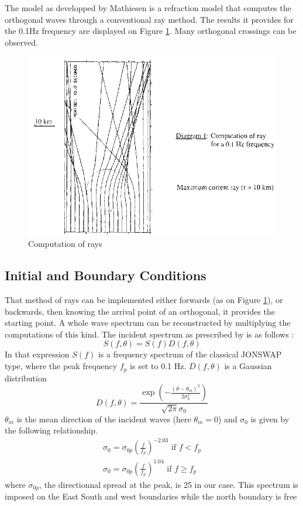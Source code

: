 The model as developped by Mathiesen is a refraction model that computes the
orthogonal waves through a conventional ray method. The results it provides for
the 0.1Hz frequency are displayed on Figure \ref{ray}. Many orthogonal
crossings can be observed.
\begin{figure} [!h]
\centering
\includegraphics[scale = 0.5]{diagram.png}
 \caption{Computation of rays}
\label{ray}
\end{figure}

\subsection{Initial and Boundary Conditions}

That method of rays can be implemented  either forwards (as on Figure
\ref{ray}), or backwards, then knowing the arrival point of an orthogonal,  it
provides the starting point. A whole wave spectrum can be reconstructed by
multiplying the computations of this kind. The incident spectrum as prescribed
by \cite{Mathiesen1987} is as follows :
$$
S(f,\theta)=S(f)D(f,\theta)
$$
In that expression $S(f)$ is a frequency spectrum of the classical JONSWAP
type, where the peak frequency $f_p$ is set to 0.1 Hz.
$D(f,\theta)$ is a Gaussian distribution
$$
D(f,\theta)=\frac{\exp(-\frac{(\theta-\theta_m)^2}{2\sigma_0^2} )}{\sqrt{2\pi}\sigma_0}
$$
$\theta_m$ is the mean direction of the incident waves (here $\theta_m=0$) and
$\sigma_0$ is given by the following relationship.
$$
\left.
\begin{array}{ll}
\sigma_0= \sigma_{0p}(\frac{f}{f_p})^{-2.03}\mbox{ if }f<f_p \\[6pt]
\sigma_0= \sigma_{0p}(\frac{f}{f_p})^{1.04}\mbox{ if } f \ge f_p
\end{array}
\right.
$$
where $\sigma_{0p}$, the directionnal spread at the peak, is 25 in our case.
This spectrum is imposed on the East South and west boundaries while the north boundary is free

